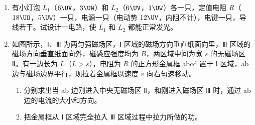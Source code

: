 \documentclass[\gkver]{gaokaozhenti}
\begin{document}
\begin{enumerate}
\item
有小灯泡 $L_{1}$（$6\UV$，$3\UW$）和 $L_{2}$（$6\UV$，$1\UW$）各一只，定值电阻 $R$（$18\UO$，$5\UW$）一只，电源一只（电动势 $12\UV$，内阻不计），电键一只，导线若干。试设计一电路，使 $L_{1}$ 和 $L_{2}$ 都能正常发光。
\onepicture[align=right, w=6.39cm]{}

\item
如图所示，Ⅰ、Ⅲ 为两匀强磁场区，Ⅰ 区域的磁场方向垂直纸面向里，Ⅲ 区域的磁场方向垂直纸面向外，磁感应强度均为 $B$，两区域中间为宽 $s$ 的无磁场区 Ⅱ。有一边长为 $L$（$L > s$），电阻为 $R$ 的正方形金属框 abcd 置于 Ⅰ 区域，ab 边与磁场边界平行，现拉着金属框以速度 $v$ 向右匀速移动。
\begin{enumerate}
	\item
	分别求出当 ab 边刚进入中央无磁场区 Ⅱ，和刚进入磁场区 Ⅲ 时，通过 ab 边的电流的大小和方向。
	\item
	把金属框从 Ⅰ 区域完全拉入 Ⅲ 区域过程中拉力所做的功。
\end{enumerate}
\onepicture[align=right, w=6.95cm]{}
\end{enumerate}
\end{document}
